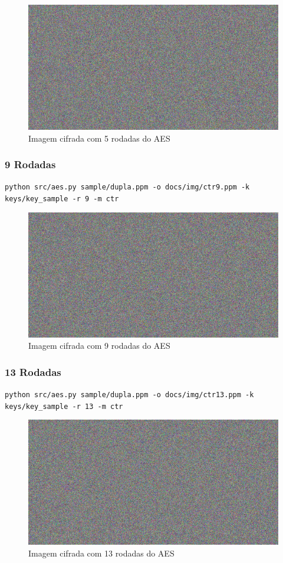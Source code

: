 \documentclass[12pt]{article}
\begin{document}
\begin{figure}[H]
	\centering
    \includegraphics[width=.5\textwidth]{img/ctr5.jpg}
    \caption{Imagem cifrada com 5 rodadas do AES}
\end{figure}

\subsubsection{9 Rodadas}

\texttt{python src/aes.py sample/dupla.ppm -o docs/img/ctr9.ppm -k keys/key\_sample -r 9 -m ctr}

\begin{figure}[H]
	\centering
    \includegraphics[width=.5\textwidth]{img/ctr9.jpg}
    \caption{Imagem cifrada com 9 rodadas do AES}
\end{figure}

\subsubsection{13 Rodadas}

\texttt{python src/aes.py sample/dupla.ppm -o docs/img/ctr13.ppm -k keys/key\_sample -r 13 -m ctr}

\begin{figure}[H]
	\centering
    \includegraphics[width=.5\textwidth]{img/ctr13.jpg}
    \caption{Imagem cifrada com 13 rodadas do AES}
\end{figure}
\end{document}
